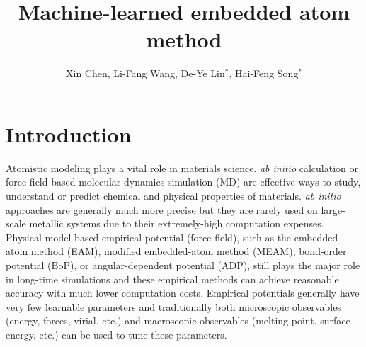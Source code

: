 \documentclass[prb,reprint]{revtex4-2}
\begin{document}
\title{
    Machine-learned embedded atom method
}

\author{Xin Chen, 
        Li-Fang Wang, 
        De-Ye Lin$^\mathrm{*}$, 
        Hai-Feng Song$^\mathrm{*}$}



% 
%
\begin{abstract}
\end{abstract}

\maketitle

% 
%
\section{Introduction}
\label{sec:introduction}

Atomistic modeling plays a vital role in materials science. \textit{ab initio} 
calculation or force-field based molecular dynamics simulation (MD) are 
effective ways to study, understand or predict chemical and physical properties 
of materials. \textit{ab initio} approaches are generally much more precise but 
they are rarely used on large-scale metallic systems due to their extremely-high 
computation expenses. Physical model based empirical potential (force-field), 
such as the embedded-atom method (EAM), modified embedded-atom method (MEAM), 
bond-order potential (BoP), or angular-dependent potential (ADP), still plays 
the major role in long-time simulations and these empirical methods can achieve 
reasonable accuracy with much lower computation costs. Empirical potentials 
generally have very few learnable parameters and traditionally both microscopic 
observables (energy, forces, virial, etc.) and macroscopic observables (melting 
point, surface energy, etc.) can be used to tune these parameters.
\end{document}
